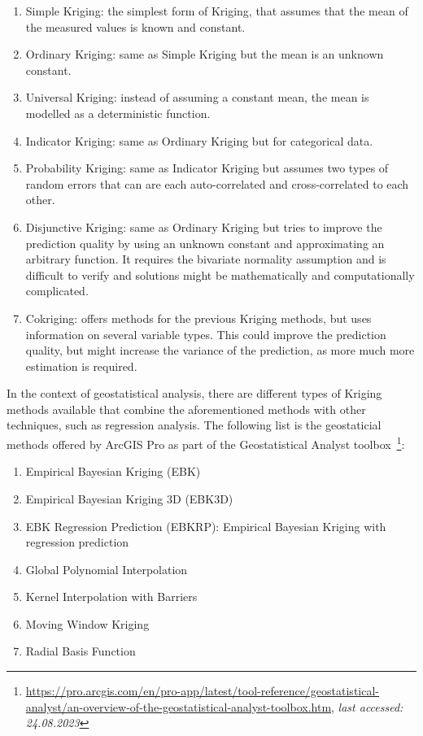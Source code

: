 \begin{enumerate}
    \item Simple Kriging: the simplest form of Kriging, that assumes that the mean of the measured values is known and constant.
    \item Ordinary Kriging: same as Simple Kriging but the mean is an unknown constant.
    \item Universal Kriging: instead of assuming a constant mean, the mean is modelled as a deterministic function.
    \item Indicator Kriging: same as Ordinary Kriging but for categorical data.
    \item Probability Kriging: same as Indicator Kriging but assumes two types of random errors that can are each auto-correlated and cross-correlated to each other.
    \item Disjunctive Kriging: same as Ordinary Kriging but tries to improve the prediction quality by using an unknown constant and approximating an arbitrary function. It requires the bivariate normality assumption and is difficult to verify and solutions might be mathematically and computationally complicated.
    \item Cokriging: offers methods for the previous Kriging methods, but uses information on several variable types. This could improve the prediction quality, but might increase the variance of the prediction, as more much more estimation is required.
\end{enumerate}

In the context of geostatistical analysis, there are different types of Kriging methods available that combine the aforementioned methods with other techniques, such as regression analysis. The following list is the geostaticial methods offered by ArcGIS Pro as part of the Geostatistical Analyst toolbox~\footnote{\url{https://pro.arcgis.com/en/pro-app/latest/tool-reference/geostatistical-analyst/an-overview-of-the-geostatistical-analyst-toolbox.htm}, \textit{last accessed: 24.08.2023}}:

\begin{enumerate}
    \item Empirical Bayesian Kriging (EBK)
    \item Empirical Bayesian Kriging 3D (EBK3D)
    \item EBK Regression Prediction (EBKRP): Empirical Bayesian Kriging with regression prediction
    \item Global Polynomial Interpolation
    \item Kernel Interpolation with Barriers
    \item Moving Window Kriging
    \item Radial Basis Function
\end{enumerate}

